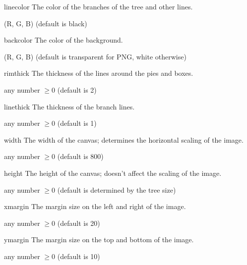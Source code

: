 \documentclass[10pt]{article}
\begin{document}
\begin{optdescrip}
	\item[linecolor] The color of the branches of the tree and other lines.
		\begin{valdescrip}
			\item[(R, G, B)] (default is black)
		\end{valdescrip}

	\item[backcolor] The color of the background.
		\begin{valdescrip}
			\item[(R, G, B)] (default is transparent for PNG, white otherwise)
		\end{valdescrip}

	\item[rimthick] The thickness of the lines around the pies and boxes.
		\begin{valdescrip}
			\item[]  any number $\ge 0$ (default is 2)
		\end{valdescrip}

	\item[linethick] The thickness of the branch lines.
		\begin{valdescrip}
			\item[]  any number $\ge 0$ (default is 1)
		\end{valdescrip}

	\item[width] The width of the canvas; determines the horizontal scaling of the image.
		\begin{valdescrip}
			\item[]  any number $\ge 0$ (default is 800)
		\end{valdescrip}

	\item[height] The height of the canvas; doesn't affect the scaling of the image.
		\begin{valdescrip}
			\item[]  any number $\ge 0$ (default is determined by the tree size)
		\end{valdescrip}

	\item[xmargin] The margin size on the left and right of the image.
		\begin{valdescrip}
			\item[]  any number $\ge 0$ (default is 20)
		\end{valdescrip}

	\item[ymargin] The margin size on the top and bottom of the image.
		\begin{valdescrip}
			\item[]  any number $\ge 0$ (default is 10)
		\end{valdescrip}

\end{optdescrip}
\end{document}
